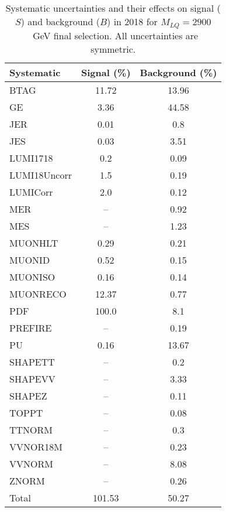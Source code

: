 \begin{table}[htbp]
\begin{center}
\caption{Systematic uncertainties and their effects on signal ($S$) and background ($B$) in 2018 for $M_{LQ}=2900$~GeV final selection. All uncertainties are symmetric.}
\begin{tabular}{lcc}
\hline\hline
Systematic & Signal (\%) & Background (\%) \\ \hline 
BTAG & 11.72 & 13.96\\ 
GE & 3.36 & 44.58\\ 
JER & 0.01 & 0.8\\ 
JES & 0.03 & 3.51\\ 
LUMI1718 & 0.2 & 0.09\\ 
LUMI18Uncorr & 1.5 & 0.19\\ 
LUMICorr & 2.0 & 0.12\\ 
MER & -- & 0.92\\ 
MES & -- & 1.23\\ 
MUONHLT & 0.29 & 0.21\\ 
MUONID & 0.52 & 0.15\\ 
MUONISO & 0.16 & 0.14\\ 
MUONRECO & 12.37 & 0.77\\ 
PDF & 100.0 & 8.1\\ 
PREFIRE & -- & 0.19\\ 
PU & 0.16 & 13.67\\ 
SHAPETT & -- & 0.2\\ 
SHAPEVV & -- & 3.33\\ 
SHAPEZ & -- & 0.11\\ 
TOPPT & -- & 0.08\\ 
TTNORM & -- & 0.3\\ 
VVNOR18M & -- & 0.23\\ 
VVNORM & -- & 8.08\\ 
ZNORM & -- & 0.26\\ 
Total & 101.53 & 50.27\\ \hline \hline
\end{tabular}
\label{tab:SysUncertainties_uujj_2900}
\end{center}
\end{table}

